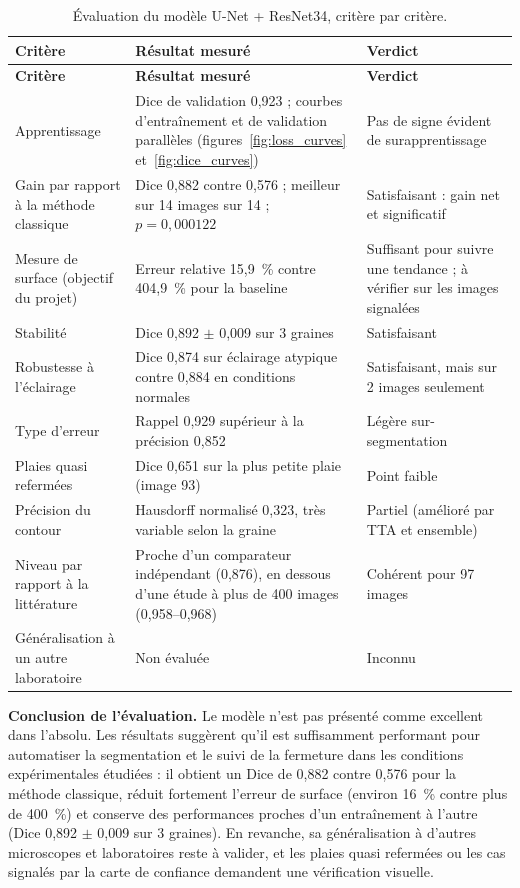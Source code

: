 \documentclass[12pt,a4paper]{report}
\begin{document}
\begin{small}
\begin{longtable}{L{3.6cm} L{6.6cm} L{3.6cm}}
\caption{Évaluation du modèle U-Net + ResNet34, critère par critère.}
\label{tab:verdict} \\
\toprule
\textbf{Critère} & \textbf{Résultat mesuré} & \textbf{Verdict} \\
\midrule
\endfirsthead
\toprule
\textbf{Critère} & \textbf{Résultat mesuré} & \textbf{Verdict} \\
\midrule
\endhead
Apprentissage & Dice de validation 0,923 ; courbes d'entraînement et de validation parallèles (figures~\ref{fig:loss_curves} et~\ref{fig:dice_curves}) & Pas de signe évident de surapprentissage \\
Gain par rapport à la méthode classique & Dice 0,882 contre 0,576 ; meilleur sur 14 images sur 14 ; $p = 0,000122$ & Satisfaisant : gain net et significatif \\
Mesure de surface (objectif du projet) & Erreur relative 15,9~\% contre 404,9~\% pour la baseline & Suffisant pour suivre une tendance ; à vérifier sur les images signalées \\
Stabilité & Dice 0,892 $\pm$ 0,009 sur 3 graines & Satisfaisant \\
Robustesse à l'éclairage & Dice 0,874 sur éclairage atypique contre 0,884 en conditions normales & Satisfaisant, mais sur 2 images seulement \\
Type d'erreur & Rappel 0,929 supérieur à la précision 0,852 & Légère sur-segmentation \\
Plaies quasi refermées & Dice 0,651 sur la plus petite plaie (image 93) & Point faible \\
Précision du contour & Hausdorff normalisé 0,323, très variable selon la graine & Partiel (amélioré par TTA et ensemble) \\
Niveau par rapport à la littérature & Proche d'un comparateur indépendant (0,876), en dessous d'une étude à plus de 400 images (0,958--0,968) & Cohérent pour 97 images \\
Généralisation à un autre laboratoire & Non évaluée & Inconnu \\
\bottomrule
\end{longtable}
\end{small}

\textbf{Conclusion de l'évaluation.} Le modèle n'est pas présenté comme excellent dans l'absolu. Les résultats suggèrent qu'il est suffisamment performant pour automatiser la segmentation et le suivi de la fermeture dans les conditions expérimentales étudiées : il obtient un Dice de 0,882 contre 0,576 pour la méthode classique, réduit fortement l'erreur de surface (environ 16~\% contre plus de 400~\%) et conserve des performances proches d'un entraînement à l'autre (Dice 0,892 $\pm$ 0,009 sur 3 graines). En revanche, sa généralisation à d'autres microscopes et laboratoires reste à valider, et les plaies quasi refermées ou les cas signalés par la carte de confiance demandent une vérification visuelle.
\end{document}
